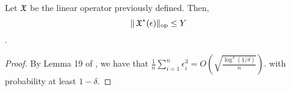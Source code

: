 \begin{lemma}
  Let $\operatorname{\mathfrak{X}}$ be the linear operator previously defined. Then,
  $$\|\operatorname{\mathfrak{X}}^*(\epsilon)\|_\text{op} \le Y$$.
\end{lemma}
\begin{proof}
%
%
%

By Lemma 19 of \cite{hsu13spherical},
we have that $\frac{1}{n} \sum_{i=1}^n \epsilon_i^3 = O(\sqrt{\frac{\log^3(1/\delta)}{n}})$.
with probability at least $1-\delta$.

\end{proof}
